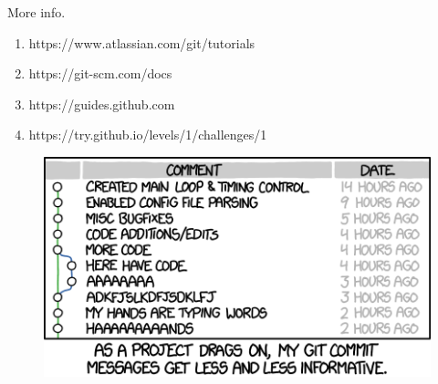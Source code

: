 \documentclass{beamer}
\begin{document}
\begin{frame}{More info.}
    \begin{enumerate}
        \item https://www.atlassian.com/git/tutorials
        \item https://git-scm.com/docs
        \item https://guides.github.com
        \item https://try.github.io/levels/1/challenges/1
    \end{enumerate}
\end{frame}

\begin{frame}
    \begin{figure}
        \includegraphics[height=.4\textheight]{git_commit}
        \label{fig:xkcd-git-commit}
    \end{figure}
\end{frame}
\end{document}
